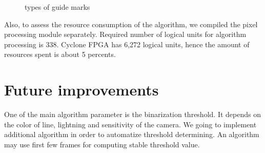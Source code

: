 \documentclass[a4paper,12pt]{article} %
\newcommand{\RomanNumeralCaps}[1]
{\MakeUppercase{\romannumeral #1}}
\begin{document}
\begin{figure}
\begin{minipage}[h]{0.49\linewidth}
	\end{minipage}
	\hfill
	\begin{minipage}[h]{0.49\linewidth}
	\end{minipage}
	
	\caption{types of guide marks}
	\label{fig:lines}
\end{figure}

Also, to assess the resource consumption of the algorithm, we compiled the pixel processing module separately. Required number of logical units for algorithm processing is 338. Cyclone \RomanNumeralCaps{4} FPGA has 6,272 logical units, hence the amount of resources spent is about 5 percents.




\section*{Future improvements}  

One of the main algorithm parameter is the binarization threshold. It depends on the color of line, lightning and sensitivity of the camera. We going to implement additional algorithm in order to automatize threshold determining. An algorithm may use first few frames for computing stable threshold value. 
\end{document}

